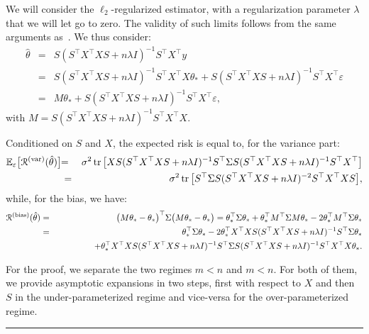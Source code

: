 \documentclass[11pt]{article}
\newcommand{\BEAS}{\begin{eqnarray*}}
\newcommand{\EEAS}{\end{eqnarray*}}
\newcommand{\BEA}{\begin{eqnarray}}
\newcommand{\EEA}{\end{eqnarray}}
\newcommand{\tr}{\mathop{ \rm tr}}
\newcommand{\idm}{I}
\newcommand{\BlackBox}{\rule{1.5ex}{1.5ex}}  %
\newenvironment{proof}{\par\noindent{\bf Proof\ }}{\hfill\BlackBox\\[2mm]}
\def \S{  { \Sigma} }
\def \E{{\mathbb E}}
\begin{document}
\begin{proof}
 We will consider the $\ell_2$-regularized estimator, with a regularization parameter $\lambda$ that we will let go to zero. The validity of such limits follows from the same arguments as~\cite[Lemma 6.2]{dobriban2018high}.
 We thus consider:
\BEAS
\hat{\theta} & = &  S ( S^\top X^\top X S + n \lambda \idm)^{-1} S^\top X^\top y\\
& = &  S ( S^\top X^\top X S + n \lambda \idm)^{-1} S^\top X^\top X\theta_\ast +
S ( S^\top X^\top X S + n \lambda \idm )^{-1} S^\top X^\top \varepsilon \\
& = &  M \theta_\ast +
S ( S^\top X^\top X S + n \lambda \idm )^{-1} S^\top X^\top \varepsilon,
\EEAS
with $M =  S ( S^\top X^\top X S + n\lambda \idm)^{-1} S^\top X^\top X$.

 
Conditioned on $S$ and $X$, the expected risk is equal to, for the variance part:
\BEA
\notag \E_{ \varepsilon} \big[ \mathcal{R}^{({\rm var})} (\hat{\theta})\big]
& \!\!= \!\!& 
 \sigma^2 \tr \big[ XS ( S^\top X^\top X S + n\lambda \idm )^{-1}  S^\top \S  S ( S^\top X^\top X S  + n\lambda \idm)^{-1} S^\top X^\top \big]
 \\
 \label{eq:varproof}  &= &   \sigma^2 \tr \big[   S^\top \S  S ( S^\top X^\top X S  + n\lambda \idm)^{-2}   S^\top X^\top X S \big]  ,
 \EEA
while, for the bias, we have:
\BEA
  \mathcal{R}^{({\rm bias})} (\hat{\theta})
 \notag & = &  \big(    M \theta_\ast - \theta_\ast \big)^\top \S  \big(    M \theta_\ast - \theta_\ast \big) 
  =  \theta_\ast ^\top \S \theta_\ast
+  
    \theta_\ast^\top M^\top \S  M \theta_\ast  
- 2 
    \theta_\ast ^\top M^\top \S  \theta_\ast  \\
  \label{eq:biasproof}  & = & 
   \theta_\ast ^\top \S \theta_\ast
   - 2 
    \theta_\ast ^\top     X^\top X S ( S^\top X^\top X S  + n\lambda \idm )^{-1} S^\top 
 \S  \theta_\ast 
 \\
\notag  & & \hspace*{1.5cm} 
 +  
    \theta_\ast^\top 
    X^\top X S ( S^\top X^\top X S + n\lambda \idm )^{-1} S^\top    
     \S  S ( S^\top X^\top X S  + n\lambda \idm )^{-1} S^\top X^\top X \theta_\ast   
  .
  \EEA



For the proof, we separate the two regimes $m<n$ and $m<n$. For both of them, we provide asymptotic expansions in two steps, first with respect to $X$ and then $S$ in the under-parameterized regime and vice-versa for the over-parameterized regime.


\end{proof}
\end{document}
